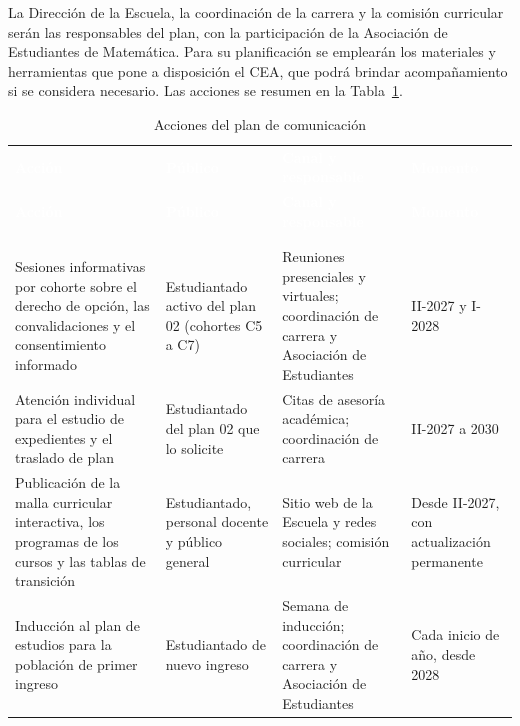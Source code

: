 La Dirección de la Escuela, la coordinación de la carrera y la comisión curricular serán las responsables del plan, con la participación de la Asociación de Estudiantes de Matemática. Para su planificación se emplearán los materiales y herramientas que pone a disposición el CEA, que podrá brindar acompañamiento si se considera necesario. Las acciones se resumen en la Tabla~\ref{tab:plan-comunicacion}.

\begingroup
\small
\setlength{\tabcolsep}{4pt}%
\renewcommand{\arraystretch}{1.2}%
%
\begin{longtable}{|>{\raggedright\arraybackslash}p{4.6cm}|>{\raggedright\arraybackslash}p{3.2cm}|>{\raggedright\arraybackslash}p{3.7cm}|>{\centering\arraybackslash}p{2.3cm}|}
\caption{Acciones del plan de comunicación}\label{tab:plan-comunicacion}\\*
\hline
\rowcolor{Azul-UCR}
\textcolor{white}{\textbf{Acción}} & \textcolor{white}{\textbf{Público}} & \textcolor{white}{\textbf{Canal y responsable}} & \textcolor{white}{\textbf{Momento}} \\* \hline
\endfirsthead
\hline
\rowcolor{Azul-UCR}
\textcolor{white}{\textbf{Acción}} & \textcolor{white}{\textbf{Público}} & \textcolor{white}{\textbf{Canal y responsable}} & \textcolor{white}{\textbf{Momento}} \\ \hline
\endhead
\multicolumn{4}{r}{\footnotesize\textit{Continúa en la página siguiente}} \\
\endfoot
\endlastfoot
\rowcolor{Celeste-UCR!35}\multicolumn{4}{|l|}{\cellcolor{Celeste-UCR!35}\textbf{Públicos internos}} \\* \hline
Sesiones informativas por cohorte sobre el derecho de opción, las convalidaciones y el consentimiento informado & Estudiantado activo del plan 02 (cohortes C5 a C7) & Reuniones presenciales y virtuales; coordinación de carrera y Asociación de Estudiantes & II-2027 y I-2028 \\ \hline
Atención individual para el estudio de expedientes y el traslado de plan & Estudiantado del plan 02 que lo solicite & Citas de asesoría académica; coordinación de carrera & II-2027 a 2030 \\ \hline
Publicación de la malla curricular interactiva, los programas de los cursos y las tablas de transición & Estudiantado, personal docente y público general & Sitio web de la Escuela y redes sociales; comisión curricular & Desde II-2027, con actualización permanente \\ \hline
Inducción al plan de estudios para la población de primer ingreso & Estudiantado de nuevo ingreso & Semana de inducción; coordinación de carrera y Asociación de Estudiantes & Cada inicio de año, desde 2028 \\ \hline

\end{longtable}
